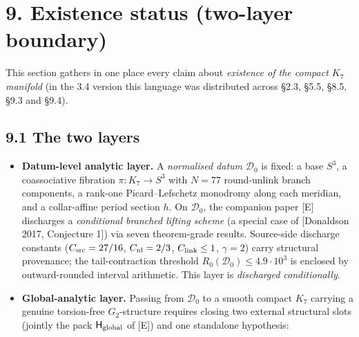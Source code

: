 \documentclass[11pt,a4paper]{article}
\begin{document}
\section{9. Existence status (two-layer boundary)}\label{existence-status-two-layer-boundary}

This section gathers in one place every claim about \emph{existence of the compact \(K_7\) manifold} (in the 3.4 version this language was distributed across §2.3, §5.5, §8.5, §9.3 and §9.4).

\subsection{9.1 The two layers}\label{the-two-layers}

\begin{itemize}
\tightlist
\item
  \textbf{Datum-level analytic layer.} A \emph{normalised datum} \(\mathcal D_0\) is fixed: a base \(S^3\), a coassociative fibration \(\pi: K_7 \to S^3\) with \(N = 77\) round-unlink branch components, a rank-one Picard--Lefschetz monodromy along each meridian, and a collar-affine period section \(h\). On \(\mathcal D_0\), the companion paper {[}E{]} discharges a \emph{conditional branched lifting scheme} (a special case of {[}Donaldson 2017, Conjecture 1{]}) via seven theorem-grade results. Source-side discharge constants (\(C_{\rm src} = 27/16\), \(C_{\rm nl} = 2/3\), \(C_{\rm link} \le 1\), \(\gamma = 2\)) carry structural provenance; the tail-contraction threshold \(R_0(\mathcal D_0) \le 4.9 \cdot 10^3\) is enclosed by outward-rounded interval arithmetic. This layer is \emph{discharged conditionally}.
\item
  \textbf{Global-analytic layer.} Passing from \(\mathcal D_0\) to a smooth compact \(K_7\) carrying a genuine torsion-free \(G_2\)-structure requires closing two external structural slots (jointly the pack \(\mathsf H_{\rm global}\) of {[}E{]}) and one standalone hypothesis:


\end{itemize}
\end{document}
